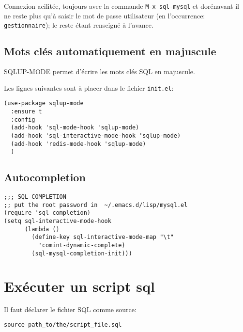 \documentclass[11pt]{article}
\begin{document}
Connexion acilitée, toujours avec la commande \texttt{M-x sql-mysql} et dorénavant il ne reste plus qu'à saisir le mot de passe utilisateur (en l'occurrence: \texttt{gestionnaire}); le reste étant renseigné à l'avance.

\subsection{Mots clés automatiquement en majuscule}
\label{sec:org35fab77}

SQLUP-MODE permet d'écrire les mots clés SQL en majuscule.

Les lignes suivantes sont  à placer dans le fichier \texttt{init.el}:

\begin{verbatim}
(use-package sqlup-mode
  :ensure t
  :config
  (add-hook 'sql-mode-hook 'sqlup-mode)
  (add-hook 'sql-interactive-mode-hook 'sqlup-mode)
  (add-hook 'redis-mode-hook 'sqlup-mode)
  )
\end{verbatim}

\subsection{Autocompletion}
\label{sec:org6f91d16}

\begin{verbatim}
;;; SQL COMPLETION
;; put the root password in  ~/.emacs.d/lisp/mysql.el
(require 'sql-completion)
(setq sql-interactive-mode-hook
      (lambda ()
        (define-key sql-interactive-mode-map "\t"
          'comint-dynamic-complete)
        (sql-mysql-completion-init)))

\end{verbatim}


\section{Exécuter un script sql}
\label{sec:org7c441c1}

Il faut déclarer le fichier SQL comme source:

\begin{verbatim}
source path_to/the/script_file.sql
\end{verbatim}
\end{document}
